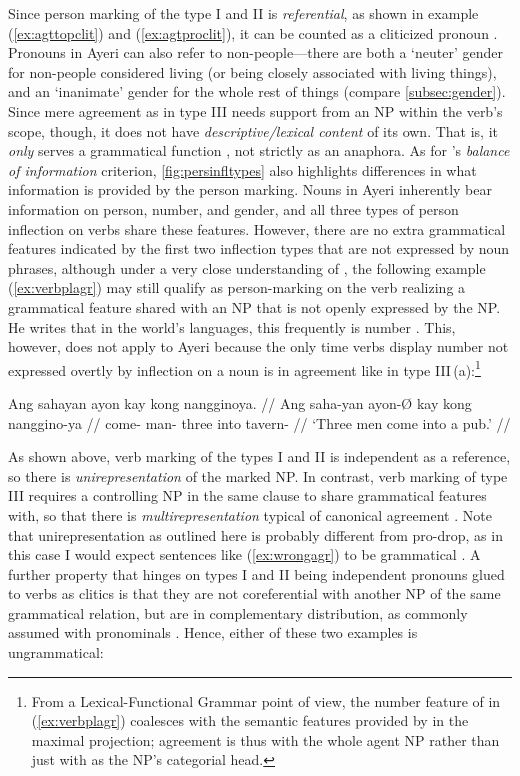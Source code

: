 Since person marking of the type I and II is \emph{referential}, as shown in
example (\ref{ex:agttopclit}) and (\ref{ex:agtproclit}), it can be counted as a
cliticized pronoun \citep[103]{corbett2006}. Pronouns in Ayeri can also refer
to non-people---there are both a `neuter' gender for non-people considered
living (or being closely associated with living things), and an `inanimate'
gender for the whole rest of things (compare \autoref{subsec:gender}). Since
mere agreement as in type III needs support from an NP within the verb's scope,
though, it does not have \emph{descriptive/lexical content} of its own. That
is, it \emph{only} serves a grammatical function \citep[104]{corbett2006}, not
strictly as an anaphora. As for \citeauthor{corbett2006}'s \emph{balance of
information} criterion, \autoref{fig:persinfltypes} also highlights differences
in what information is provided by the person marking. Nouns in Ayeri
inherently bear information on person, number, and gender, and all three types
of person inflection on verbs share these features. However, there are no extra
grammatical features indicated by the first two inflection types that are not
expressed by noun phrases, although under a very close understanding of
\citeauthor{corbett2006}, the following example (\ref{ex:verbplagr}) may still
qualify as person-marking on the verb realizing a grammatical feature shared
with an NP that is not openly expressed by the NP. He writes that in the
world's languages, this frequently is number \citep[105]{corbett2006}. This,
however, does not apply to Ayeri because the only time verbs display number not
expressed overtly by inflection on a noun is in agreement like in type
III\,(a):\footnote{From a Lexical-Functional Grammar point of view, the number
feature of  in (\ref{ex:verbplagr}) coalesces with the semantic
features provided by  in the maximal projection; agreement is
thus with the whole agent NP rather than just with
 as the NP's categorial head.}

\ex\label{ex:verbplagr} %
\begingl
	\gla Ang sahayan ayon kay kong nangginoya. //
	\glb Ang saha-yan ayon-Ø kay kong nanggino-ya //
	\glc \AgtT{} come-\TplM{} man-\Top{} three into tavern-\Loc{} //
	\glft `Three men come into a pub.' //
\endgl\xe

As shown above, verb marking of the types I and II is independent as a
reference, so there is \emph{unirepresentation} of the marked NP. In contrast,
verb marking of type III requires a controlling NP in the same clause to share
grammatical features with, so that there is \emph{multirepresentation} typical
of canonical agreement \citep[106]{corbett2006}. Note that unirepresentation as
outlined here is probably different from pro-drop, as in this case I would
expect sentences like (\ref{ex:wrongagr}) to be grammatical
\citep[107]{corbett2006}. A further property that hinges on types I and II
being independent pronouns glued to verbs as clitics is that they are not
coreferential with another NP of the same grammatical relation, but are in
complementary distribution, as commonly assumed with pronominals
\citep[108]{corbett2006}. Hence, either of these two examples is ungrammatical:

